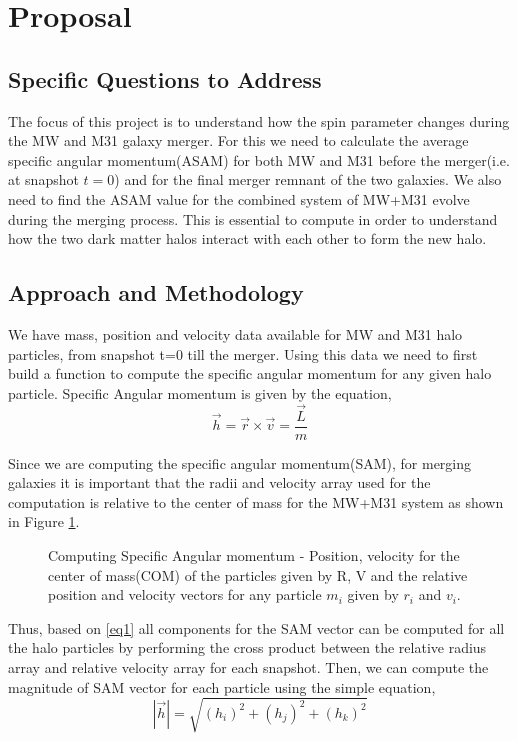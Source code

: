 \documentclass[twocolumn]{aastex631}
\begin{document}
\section{Proposal} \label{sec:proposal}
\subsection{Specific Questions to Address}
The focus of this project is to understand how the spin parameter changes during the MW and M31 galaxy merger. For this we need to calculate the average specific angular momentum(ASAM) for both MW and M31 before the merger(i.e. at snapshot $t=0$) and for the final merger remnant of the two galaxies. We also need to find the ASAM value for the combined system of MW+M31 evolve during the merging process. This is essential to compute in order to understand how the two dark matter halos interact with each other to form the new halo.

\subsection{Approach and Methodology}
We have mass, position and velocity data available for MW and M31 halo particles, from snapshot t=0 till the merger. Using this data we need to first build a function to compute the specific angular momentum for any given halo particle. Specific Angular momentum is given by the equation, 
\begin{equation} \label{eq1}
\vec{h} = \vec{r} \times \vec{v} = \frac{\vec{L}}{m}
\end{equation}

Since we are computing the specific angular momentum(SAM), for merging galaxies it is important that the radii and velocity array used for the computation is relative to the center of mass for the MW+M31 system as shown in Figure \ref{fig:ang_p}.\\
\begin{figure}[H]
\caption{Computing Specific Angular momentum - Position, velocity for the center of mass(COM) of the particles given by R, V and the relative position and velocity vectors for any particle $m_{i}$ given by $r_{i}$ and $v_{i}$.
\label{fig:ang_p}}
\end{figure}
Thus, based on \ref{eq1} all components for the SAM vector can be computed for all the halo particles by performing the cross product between the relative radius array and relative velocity array for each snapshot. Then, we can compute the magnitude of SAM vector for each particle using the simple equation,
\begin{equation}
|\vec{h}| = \sqrt{(h_{i})^2 + (h_{j})^2 + (h_{k})^2}
\end{equation}
\end{document}
